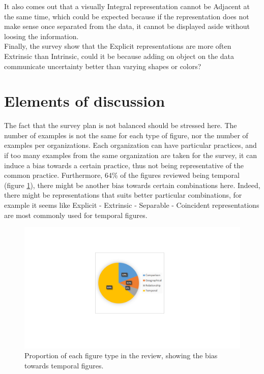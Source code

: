 \documentclass[12pt,a4paper]{article}
\begin{document}
It also comes out that a visually Integral representation cannot be Adjacent at the same time, which could be expected because if the representation does not make sense once separated from the data, it cannot be displayed aside without loosing the information.\\
Finally, the survey show that the Explicit representations are more often Extrinsic than Intrinsic, could it be because adding on object on the data communicate uncertainty better than varying shapes or colors?

\section{Elements of discussion}

The fact that the survey plan is not balanced should be stressed here.
The number of examples is not the same for each type of figure, nor the number of examples per organizations.
Each organization can have particular practices, and if too many examples from the same organization are taken for the survey, it can induce a bias towards a certain practice, thus not being representative of the common practice.
Furthermore, 64\% of the figures reviewed being temporal (figure \ref{res2}), there might be another bias towards certain combinations here. 
Indeed, there might be representations that suits better particular combinations, for example it seems like Explicit - Extrinsic - Separable - Coincident representations are most commonly used for temporal figures.

\begin{figure}
\centering
\includegraphics[scale=0.5]{workshop-figtype-piechart.png}
\caption{Proportion of each figure type in the review, showing the bias towards temporal figures.}
\label{res2}
\end{figure}
\end{document}
